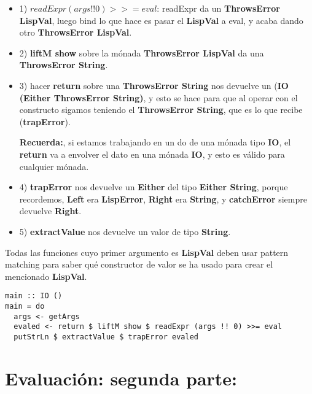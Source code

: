 \begin{itemize}

\item 1) $readExpr (args !! 0) >>= eval$: readExpr da un \textbf{ThrowsError LispVal}, luego bind lo que hace es pasar el \textbf{LispVal} a eval, y acaba dando otro \textbf{ThrowsError LispVal}.

\item 2) \textbf{liftM show} sobre la m\'onada \textbf{ThrowsError LispVal} da una \textbf{ThrowsError String}.

\item 3) hacer \textbf{return} sobre una \textbf{ThrowsError String} nos devuelve un (\textbf{IO (Either ThrowsError String)}, y esto se hace para que al operar con el constructo \textbf{\<\-} sigamos teniendo el \textbf{ThrowsError String}, que es lo que recibe (\textbf{trapError}).

\textbf{Recuerda:}, si estamos trabajando en un do de una m\'onada tipo \textbf{IO}, el \textbf{return} va a envolver el dato en una m\'onada \textbf{IO}, y esto es v\'alido para cualquier m\'onada.

\item 4) \textbf{trapError} nos devuelve un \textbf{Either} del tipo \textbf{Either String}, porque recordemos, \textbf{Left} era \textbf{LispError}, \textbf{Right} era \textbf{String}, y \textbf{catchError} siempre devuelve \textbf{Right}.

\item 5) \textbf{extractValue} nos devuelve un valor de tipo \textbf{String}.
\end{itemize}

Todas las funciones cuyo primer argumento es \textbf{LispVal} deben usar pattern matching para saber qu\'e constructor de valor se ha usado para crear el mencionado \textbf{LispVal}.\\

\begin{minipage}{\linewidth}
\begin{footnotesize}
\begin{lstlisting}[frame=single]
main :: IO ()
main = do
  args <- getArgs
  evaled <- return $ liftM show $ readExpr (args !! 0) >>= eval
  putStrLn $ extractValue $ trapError evaled
\end{lstlisting}
\end{footnotesize}
\end{minipage}

\section{Evaluaci\'on: segunda parte:}
\label{3:sec4}

